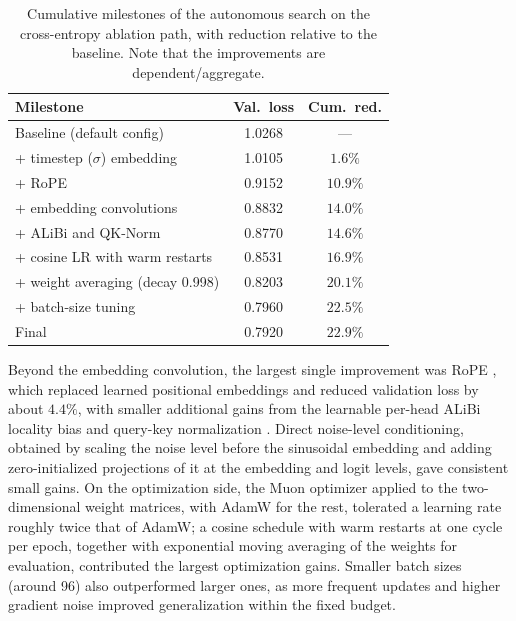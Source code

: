 \documentclass[11pt]{article}
\begin{document}
\begin{table}[t]
  \centering
  \small
  \setlength{\tabcolsep}{4pt}
  \begin{tabular}{lcc}
    \toprule
    \textbf{Milestone} & \textbf{Val.\ loss} & \textbf{Cum.\ red.} \\
    \midrule
    Baseline (default config)          & 1.0268 & --- \\
    \;+ timestep ($\sigma$) embedding  & 1.0105 & $1.6\%$ \\
    \;+ RoPE                           & 0.9152 & $10.9\%$ \\
    \;+ embedding convolutions         & 0.8832 & $14.0\%$ \\
    \;+ ALiBi and QK-Norm              & 0.8770 & $14.6\%$ \\
    \;+ cosine LR with warm restarts   & 0.8531 & $16.9\%$ \\
    \;+ weight averaging (decay 0.998) & 0.8203 & $20.1\%$ \\
    \;+ batch-size tuning              & 0.7960 & $22.5\%$ \\
    Final                              & 0.7920 & $22.9\%$ \\
    \bottomrule
  \end{tabular}
  \caption{Cumulative milestones of the autonomous search on the cross-entropy
  ablation path, with reduction relative to the baseline. Note that the improvements are dependent/aggregate.}
  \label{tab:milestones}
\end{table}

Beyond the embedding convolution, the largest single improvement was RoPE
\citep{su2021rope}, which replaced learned positional embeddings and reduced
validation loss by about $4.4\%$, with smaller additional gains from the
learnable per-head ALiBi locality bias \citep{press2022alibi} and query-key
normalization \citep{henry2020qknorm}. Direct noise-level conditioning, obtained
by scaling the noise level before the sinusoidal embedding and adding
zero-initialized projections of it at the embedding and logit levels, gave
consistent small gains. On the optimization side, the Muon optimizer
\citep{jordan2024muon} applied to the two-dimensional weight matrices, with AdamW
for the rest, tolerated a learning rate roughly twice that of AdamW; a cosine
schedule with warm restarts \citep{loshchilov2017sgdr} at one cycle per epoch,
together with exponential moving averaging of the weights for evaluation,
contributed the largest optimization gains. Smaller batch sizes (around 96) also
outperformed larger ones, as more frequent updates and higher gradient noise
improved generalization within the fixed budget.
\end{document}
